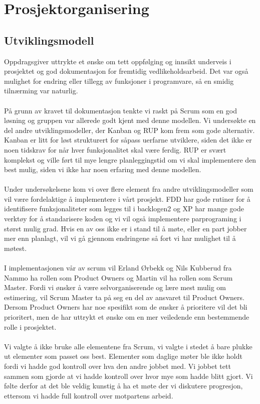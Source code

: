 \chapter{Prosjektorganisering}
\section{Utviklingsmodell}
Oppdragsgiver uttrykte et ønske om tett oppfølging og innsikt underveis i prosjektet og god dokumentasjon for fremtidig vedlikeholdsarbeid. Det var også mulighet for endring eller tillegg av funksjoner i programvare, så en smidig tilnærming var naturlig. \\ \\
På grunn av kravet til dokumentasjon tenkte vi raskt på Scrum som en god løsning og gruppen var allerede godt kjent med denne modellen. Vi undersøkte en del andre utviklingsmodeller, der Kanban og RUP kom frem som gode alternativ. Kanban er litt for løst strukturert for såpass uerfarne utviklere, siden det ikke er noen tidskrav for når hver funksjonalitet skal være ferdig. RUP er svært komplekst og ville ført til mye lengre planleggingstid om vi skal implementere den best mulig, siden vi ikke har noen erfaring med denne modellen.\\ \\ 
Under undersøkelsene kom vi over flere element fra andre utviklingsmodeller som vil være fordelaktige å implementere i vårt prosjekt. FDD har gode rutiner for å identifisere funksjonaliteter som legges til i backlogen2 og XP har mange gode verktøy for å standarisere koden og vi vil også implementere parprograming i størst mulig grad. Hvis en av oss ikke er i stand til å møte, eller en part jobber mer enn planlagt, vil vi gå gjennom endringene så fort vi har mulighet til å møtest. \\ \\
I implementasjonen vår av scrum vil Erland Ørbekk og Nils Kubberud fra Nammo ha rollen som Product Owners og Martin vil ha rollen som Scrum Master. Fordi vi ønsker å være selvorganiserende og lære mest mulig om estimering, vil Scrum Master ta på seg en del av ansvaret til Product Owners. Dersom Product Owners har noe spesifikt som de ønsker å prioritere vil det bli prioritert, men de har uttrykt et ønske om en mer veiledende enn bestemmende rolle i prosjektet. \\ \\
Vi valgte å ikke bruke alle elementene fra Scrum, vi valgte i stedet å bare plukke ut elementer som passet oss best. Elementer som daglige møter ble ikke holdt fordi vi hadde god kontroll over hva den andre jobbet med. Vi jobbet tett sammen som gjorde at vi hadde kontroll over hvor mye som hadde blitt gjort. Vi følte derfor at det ble veldig kunstig å ha et møte der vi diskutere progresjon, ettersom vi hadde full kontroll over motpartens arbeid.\\ \\
